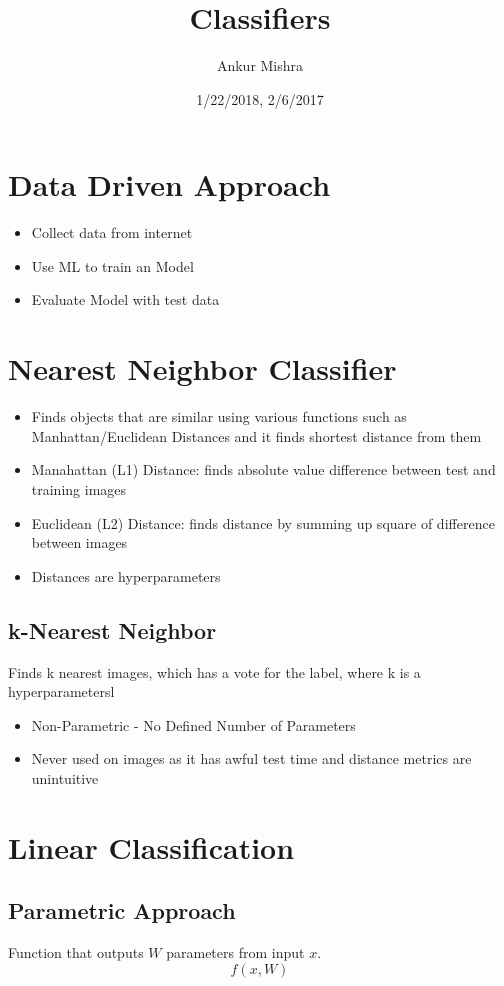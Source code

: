 \documentclass[11pt]{article}
\author{Ankur Mishra}
\date{1/22/2018, 2/6/2017}
\title{Classifiers}
\begin{document}
\maketitle
\tableofcontents

\section{Data Driven Approach}
\label{sec-1}
\begin{itemize}
\item Collect data from internet
\item Use ML to train an Model
\item Evaluate Model with test data
\end{itemize}
\section{Nearest Neighbor Classifier}
\label{sec-2}
\begin{itemize}
\item Finds objects that are similar using various functions such as Manhattan/Euclidean Distances and it finds shortest distance from them
\item Manahattan (L1) Distance: finds absolute value difference between test and training images
\item Euclidean (L2) Distance: finds distance by summing up square of difference between images
\item Distances are hyperparameters
\end{itemize}
\subsection{k-Nearest Neighbor}
\label{sec-2-1}
Finds k nearest images, which has a vote for the label, where k is a hyperparametersl
\begin{itemize}
\item Non-Parametric - No Defined Number of Parameters
\item Never used on images as it has awful test time and distance metrics are unintuitive
\end{itemize}
\section{Linear Classification}
\label{sec-3}
\subsection{Parametric Approach}
\label{sec-3-1}
Function that outputs $W$ parameters from input $x$. 
\begin{equation}
f(x, W)
\end{equation}
\end{document}
